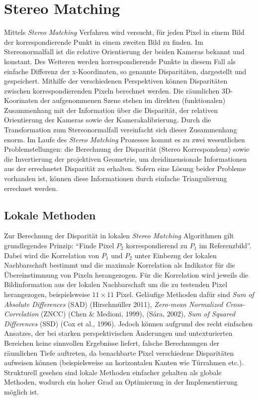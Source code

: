 \section{Stereo Matching}
\label{sec:stereo_matching}
Mittels \emph{Stereo Matching} Verfahren wird versucht, für jeden Pixel in einem Bild der korrespondierende Punkt in einem zweiten Bild zu finden. Im Stereonormalfall ist die relative Orientierung der beiden Kameras bekannt und konstant. Des Weiteren werden korrespondierende Punkte in diesem Fall als einfache Differenz der x-Koordinaten, so genannte Disparitäten, dargestellt und gespeichert. Mithilfe der verschiedenen Perspektiven können Disparitäten zwischen korrespondierenden Pixeln berechnet werden. Die räumlichen 3D-Koorinaten der aufgenommenen Szene stehen im direkten (funktionalen) Zusammenhang mit der Information über die Disparität, der  relativen Orientierung der Kameras sowie der Kamerakalibrierung. Durch die Transformation zum Stereonormalfall vereinfacht sich dieser Zusammenhang enorm. Im Laufe des \emph{Stereo Matching} Prozesses kommt es zu zwei wesentlichen Problemstellungen: die Berechnung der Disparität (Stereo Korrespondenz) sowie die Invertierung der projektiven Geometrie, um dreidimensionale Informationen aus der errechnetet Disparität zu erhalten. Sofern eine Lösung beider Probleme vorhanden ist, können diese Informationen durch einfache Triangulierung errechnet werden.

\subsection{Lokale Methoden}
\label{subsec:local_methods}
Zur Berechnung der Disparität in lokalen \emph{Stereo Matching} Algorithmen gilt grundlegendes Prinzip: \enquote{Finde Pixel $P_2$ korrespondierend zu $P_1$ im Referenzbild}. Dabei wird die Korrelation von $P_1$ und $P_2$ unter Einbezug der lokalen Nachbarschaft bestimmt und die maximale Korrelation als Indikator für die Übereinstimmung von Pixeln herangezogen. Für die Korrelation wird jeweils die Bildinformation aus der lokalen Nachbarschaft um die zu testenden Pixel herangezogen, beispielsweise $11\times11$ Pixel. Geläufige Methoden dafür sind \emph{Sum of Absolute Differences} (SAD) (Hirschmüller 2011), \emph{Zero-mean Normalized Cross-Correlation} (ZNCC) (Chen \& Medioni, 1999), (Sára, 2002), \emph{Sum of Squared Differences} (SSD) (Cox et al., 1996). Jedoch können aufgrund des recht einfachen Ansatzes, der bei starken perspektivischen Änderungen und untexturierten Bereichen keine sinnvollen Ergebnisse liefert, falsche Berechnungen der räumlichen Tiefe auftreten, da benachbarte Pixel verschiedene Disparitäten aufweisen können (beispielsweise an horizontalen Kanten wie Türrahmen etc.). Strukturell gesehen sind lokale Methoden einfacher gehalten als globale Methoden, wodurch ein hoher Grad an Optimierung in der Implementierung möglich ist.

